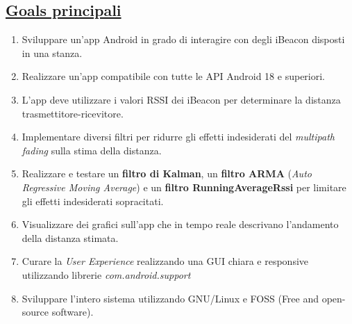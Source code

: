 \subsection{\underline{Goals principali}}
\begin{enumerate}
	\item Sviluppare un'app Android in grado di interagire con degli iBeacon disposti in una stanza.
	
	\item Realizzare un'app compatibile con tutte le API Android 18 e superiori.
	
	\item L'app deve utilizzare i valori RSSI dei iBeacon per determinare la distanza trasmettitore-ricevitore.
	
	\item Implementare diversi filtri per ridurre gli effetti indesiderati del \textit{multipath fading} sulla stima della distanza.
	
	\item Realizzare e testare un \textbf{filtro di Kalman}, un \textbf{filtro ARMA} (\textit{Auto Regressive Moving Average}) e un \textbf{filtro RunningAverageRssi} per limitare gli effetti indesiderati sopracitati.
	
	\item Visualizzare dei grafici sull'app che in tempo reale descrivano l'andamento della distanza stimata.
	
	\item Curare la \textit{User Experience} realizzando una GUI chiara e responsive utilizzando librerie \textit{com.android.support}
	
	\item Sviluppare l'intero sistema utilizzando GNU/Linux e FOSS (Free and open-source software).
\end{enumerate}

